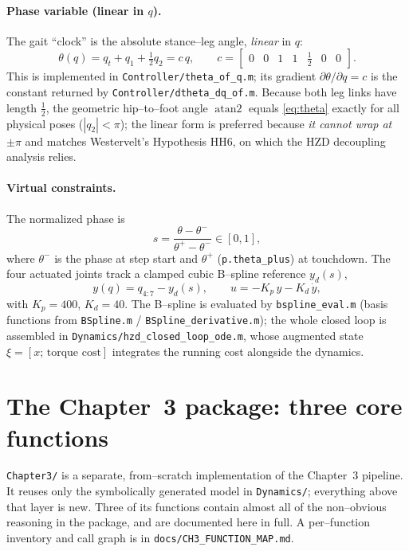 \documentclass[11pt,a4paper]{article}
\newcommand{\code}[1]{\texttt{#1}}          %
\newcommand{\fname}[1]{\texttt{#1}}          %
\begin{document}
\paragraph{Phase variable (linear in $q$).}
The gait ``clock'' is the absolute stance--leg angle, \emph{linear} in $q$:
\begin{equation}
  \theta(q) = q_t + q_1 + \tfrac{1}{2}q_2 = c\,q,
  \qquad c = \begin{bmatrix} 0 & 0 & 1 & 1 & \tfrac12 & 0 & 0 \end{bmatrix}.
  \label{eq:theta}
\end{equation}
This is implemented in \fname{Controller/theta\_of\_q.m}; its gradient
$\partial\theta/\partial q = c$ is the constant returned by
\fname{Controller/dtheta\_dq\_of.m}. Because both leg links have length
$\tfrac12$, the geometric hip--to--foot angle $\operatorname{atan2}$ equals
\eqref{eq:theta} exactly for all physical poses ($|q_2|<\pi$); the linear form
is preferred because \emph{it cannot wrap at $\pm\pi$} and matches Westervelt's
Hypothesis HH6, on which the HZD decoupling analysis relies.

\paragraph{Virtual constraints.}
The normalized phase is
\begin{equation}
  s = \frac{\theta - \theta^{-}}{\theta^{+} - \theta^{-}} \in [0,1],
\end{equation}
where $\theta^{-}$ is the phase at step start and $\theta^{+}$
(\code{p.theta\_plus}) at touchdown. The four actuated joints track a clamped
cubic B--spline reference $y_d(s)$,
\begin{equation}
  y(q) = q_{4:7} - y_d(s), \qquad u = -K_p\,y - K_d\,\dot y,
\end{equation}
with $K_p=400$, $K_d=40$. The B--spline is evaluated by
\fname{bspline\_eval.m} (basis functions from \fname{BSpline.m} /
\fname{BSpline\_derivative.m}); the whole closed loop is assembled in
\fname{Dynamics/hzd\_closed\_loop\_ode.m}, whose augmented state
$\xi = [x;\,\text{torque cost}]$ integrates the running cost alongside the
dynamics.

\section{The Chapter~3 package: three core functions}
\label{sec:core}
\fname{Chapter3/} is a separate, from--scratch implementation of the Chapter~3
pipeline. It reuses only the symbolically generated model in \fname{Dynamics/};
everything above that layer is new. Three of its functions contain almost all of
the non--obvious reasoning in the package, and are documented here in full. A
per--function inventory and call graph is in \fname{docs/CH3\_FUNCTION\_MAP.md}.
\end{document}
